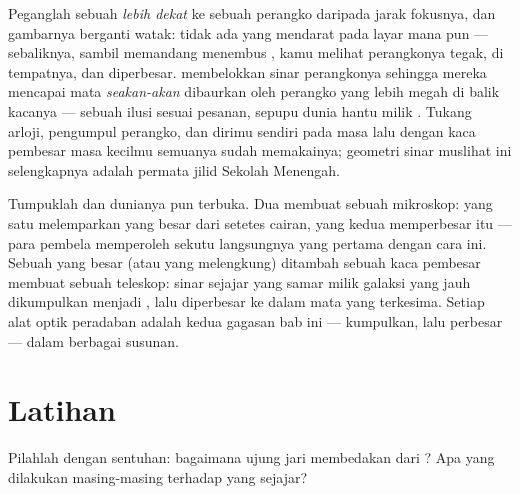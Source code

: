 \begin{example}\label{ex:g8:lenses-images:magnifier}
Peganglah sebuah  \emph{lebih dekat} ke sebuah perangko
daripada jarak fokusnya, dan gambarnya berganti watak: tidak ada
 yang mendarat pada layar mana pun --- sebaliknya, sambil
memandang menembus , kamu melihat perangkonya tegak, di
tempatnya, dan diperbesar.  membelokkan sinar perangkonya
sehingga mereka mencapai mata \emph{seakan-akan} dibaurkan oleh
perangko yang lebih megah di balik kacanya --- sebuah ilusi sesuai
pesanan, sepupu dunia hantu milik . Tukang arloji, pengumpul
perangko, dan dirimu sendiri pada masa lalu dengan kaca pembesar masa
kecilmu semuanya sudah memakainya; geometri sinar muslihat ini
selengkapnya adalah permata jilid Sekolah Menengah.
\end{example}

\begin{remark}\label{rem:g8:lenses-images:instruments}
Tumpuklah  dan dunianya pun terbuka. Dua  membuat
sebuah mikroskop: yang satu melemparkan  yang besar dari
setetes cairan, yang kedua memperbesar  itu --- para pembela
 memperoleh sekutu langsungnya yang pertama dengan cara ini.
Sebuah  yang besar (atau  yang melengkung) ditambah sebuah
kaca pembesar membuat sebuah teleskop: sinar sejajar yang samar milik
galaksi yang jauh dikumpulkan menjadi , lalu diperbesar
ke dalam mata yang terkesima. Setiap alat optik peradaban adalah kedua
gagasan bab ini --- kumpulkan, lalu perbesar --- dalam berbagai susunan.
\end{remark}

\section{Latihan}

\begin{exercise}[$\star$]\label{exo:g8:lenses-images:1}
Pilahlah dengan sentuhan: bagaimana ujung jari membedakan  dari ? Apa yang dilakukan masing-masing terhadap
 yang sejajar?
\end{exercise}

